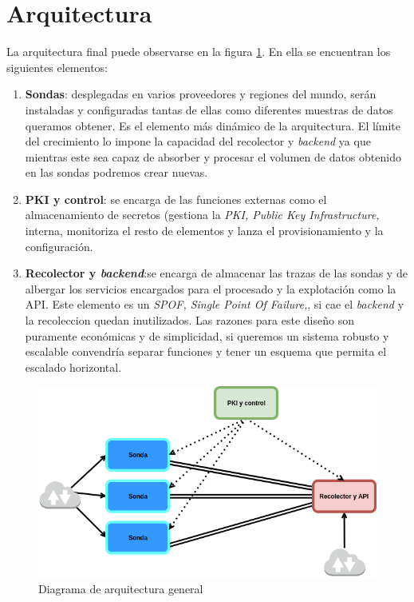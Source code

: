 \section{Arquitectura}

La arquitectura final puede observarse en la figura \ref{fig:arquitectura-general}. En ella se encuentran los siguientes elementos:

\begin{enumerate}
    \item \textbf{Sondas}: desplegadas en varios proveedores y regiones del mundo, serán instaladas y configuradas tantas de ellas como
    diferentes muestras de datos queramos obtener. Es el elemento más dinámico de la arquitectura. El límite del crecimiento lo impone la capacidad
    del recolector y \emph{backend} ya que mientras este sea capaz de absorber y procesar el volumen de datos obtenido en las sondas podremos crear nuevas.
    \item \textbf{PKI y control}: se encarga de las funciones externas como el almacenamiento de secretos (gestiona la \emph{PKI, Public Key Infrastructure,} interna, monitoriza el resto de elementos y lanza el provisionamiento y la configuración.
    \item \textbf{Recolector y \emph{backend}}:se encarga de almacenar las trazas de las sondas y de albergar los servicios encargados para el procesado y la explotación como la API. Este elemento es un \emph{SPOF, Single Point Of Failure,}, si cae el \emph{backend} y la recoleccion quedan inutilizados.
    Las razones para este diseño son puramente económicas y de simplicidad, si queremos un sistema robusto y escalable convendría separar funciones y tener un esquema que permita el escalado horizontal.
\end{enumerate}

\begin{figure}[h]
    \centering
      \includegraphics[scale=0.5]{images/arquitectura_general}
    \caption{Diagrama de arquitectura general}
    \label{fig:arquitectura-general}
  \end{figure}

